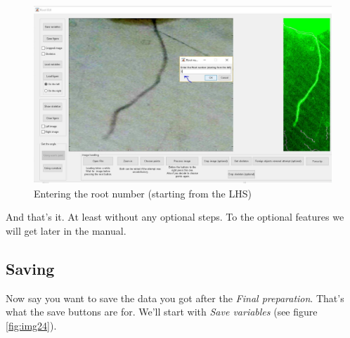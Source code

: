 \begin{figure}[H]
	\centering
	\includegraphics[width=\textwidth]{../Figures/manual/step20.jpg}
	\caption{Entering the root number (starting from the LHS)}
	\label{fig:img23}
\end{figure}

And that's it. At least without any optional steps. To the optional features we will get later in the manual. 


\subsection{Saving}

Now say you want to save the data you got after the \textit{Final preparation}. That's what the save buttons are for.
We'll start with \textit{Save variables} (see figure \ref{fig:img24}).

